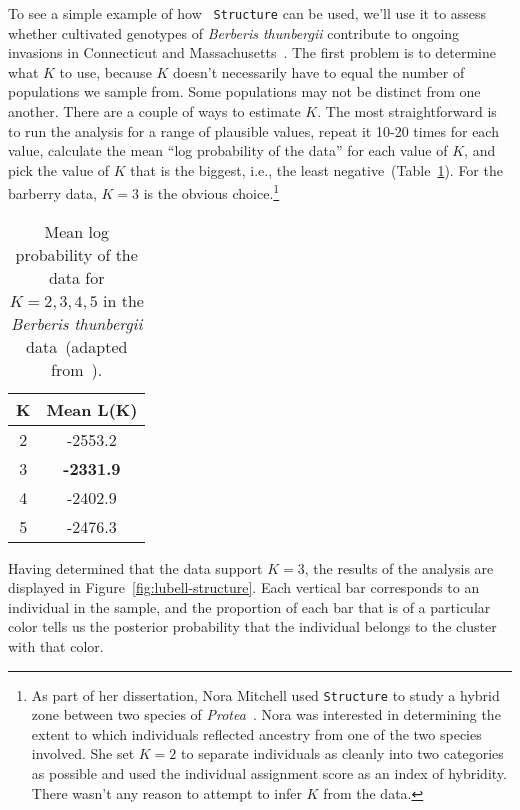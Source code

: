 To see a simple example of how {\tt
  Structure} can be used, we'll
use it to assess whether cultivated genotypes of {\it Berberis
  thunbergii\/}
contribute to ongoing invasions in Connecticut and
Massachusetts~\cite{Lubell-etal-2008}. The first problem is to determine what $K$
to use, because $K$ doesn't necessarily have to equal the number of
populations we sample from. Some populations may not be distinct from
one another. There are a couple of ways to estimate $K$. The most
straightforward is to run the analysis for a range of plausible
values, repeat it 10-20 times for each value, calculate the mean ``log
probability of the data'' for each value of $K$, and pick the value of
$K$ that is the biggest, i.e., the least
negative~(Table~\ref{table:berberis-k}). For the barberry data, $K=3$
is the obvious choice.\footnote{As part of her dissertation, Nora
  Mitchell used {\tt Structure} to study a hybrid zone between two
  species of {\it Protea}~\cite{Mitchell-Holsinger-2018}. Nora was
  interested in determining the extent to which individuals reflected
  ancestry from one of the two species involved. She set $K=2$ to
  separate individuals as cleanly into two categories as possible and
  used the individual assignment score as an index of hybridity. There
  wasn't any reason to attempt to infer $K$ from the data.}

\begin{table}
\begin{center}
\begin{tabular}{cc}
\hline\hline
K & Mean L(K) \\
\hline
2 & -2553.2 \\
3 & {\bf -2331.9} \\
4 & -2402.9 \\
5 & -2476.3 \\
\hline
\end{tabular}
\end{center}
\caption{Mean log probability of the data for $K=2,3,4,5$ in the {\it
    Berberis thunbergii\/} data~(adapted
  from~\cite{Lubell-etal-2008}).}\label{table:berberis-k}
\end{table}

Having determined that the data support $K=3$, the results of the
analysis are displayed in Figure~\ref{fig:lubell-structure}. Each
vertical bar corresponds to an individual in the sample, and the
proportion of each bar that is of a particular color tells us the
posterior probability that the individual belongs to the cluster with
that color.

